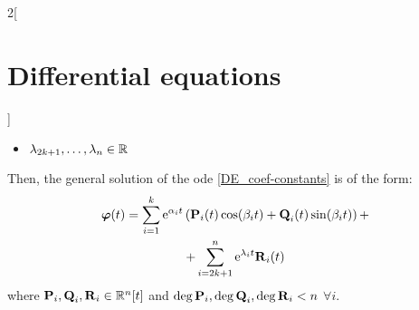 \documentclass[../../../main.tex]{subfiles}
\begin{document}
\begin{multicols}{2}[\section{Differential equations}]
\begin{corollary}
\begin{itemize}
      \item $\lambda_{2k+1},\ldots,\lambda_n\in\mathbb{R}$
    \end{itemize}
    Then, the general solution of the ode \eqref{DE_coef-constants} is of the form:
    \begin{multline*}
      \boldsymbol{\mathrm{\varphi}}(t)=\sum_{i=1}^k\mathrm{e}^{\alpha_i t}\left(\boldsymbol{\mathrm{P}}_i(t)\cos(\beta_i t)+\boldsymbol{\mathrm{Q}}_i(t)\sin(\beta_i t)\right)+\\+\sum_{i=2k+1}^n\mathrm{e}^{\lambda_i t}\boldsymbol{\mathrm{R}}_i(t)
    \end{multline*}
    where $\boldsymbol{\mathrm{P}}_i,\boldsymbol{\mathrm{Q}}_i,\boldsymbol{\mathrm{R}}_i\in\mathbb{R}^n[t]$ and $\deg \boldsymbol{\mathrm{P}}_i,\deg\boldsymbol{\mathrm{Q}}_i,\deg\boldsymbol{\mathrm{R}}_i<n$ $\forall i$.
  \end{corollary}
\end{multicols}
\end{document}
